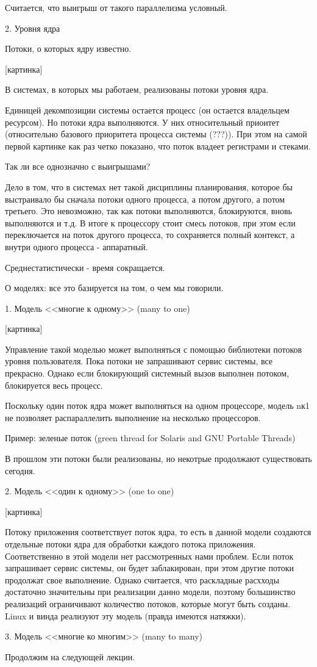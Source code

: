 \documentclass[a4paper, 12pt]{report}
\begin{document}
	Считается, что выигрыш от такого параллелизма условный.
	
	2. Уровня ядра
	
	Потоки, о которых ядру известно.
	
	[картинка]
	
	В системах, в которых мы работаем, реализованы потоки уровня ядра.
	
	Единицей декомпозиции системы остается процесс (он остается владельцем ресурсом). Но потоки ядра выполняются. У них относительный приоитет (относительно базового приоритета процесса системы (???)). При этом на самой первой картинке как раз четко показано, что поток владеет регистрами и стеками.
	
	Так ли все однозначно с выигрышами?
	
	Дело в том, что в системах нет такой дисциплины планирования, которое бы выстраивало бы сначала потоки одного процесса, а потом другого, а потом третьего. Это невозможно, так как потоки выполняются, блокируются, вновь выполняются и т.д. В итоге к процессору стоит смесь потоков, при этом если переключается на поток другого процесса, то сохраняется полный контекст, а внутри одного процесса - аппаратный.
	
	Среднестатистически - время сокращается.
	
	О моделях: все это базируется на том, о чем мы говорили.
	
	1. Модель <<многие к одному>> (many to one)
	
	[картинка]
	
	Управление такой моделью может выполняться с помощью библиотеки потоков уровня пользователя. Пока потоки не запрашивают сервис системы, все прекрасно. Однако если блокирующий системный вызов выполнен потоком, блокируется весь процесс.
	
	Поскольку один поток ядра может выполняться на одном процессоре, модель nк1 не позволяет распараллелить выполнение на несколько процессоров.
	
	Пример: зеленые поток (green thread for Solaris and GNU Portable Threads)
	
	В прошлом эти потоки были реализованы, но некотрые продолжают существовать сегодня.
	
	2. Модель <<один к одному>> (one to one)
	
	[картинка]
	
	Потоку приложения соответствует поток ядра, то есть в данной модели создаются отдельные потоки ядра для обработки каждого потока приложения. Соответственно в этой модели нет рассмотренных нами проблем. Если поток запрашивает сервис системы, он будет заблакирован, при этом другие потоки продолжат свое выполнение. Однако считается, что раскладные расхходы достаточно значительны при реализации данно модели, поэтому большинство реализаций ограничивают количество потоков, которые могут быть созданы. Linux и винда реализуют эту модель (правда имеются натяжки).
	
	3. Модель <<многие ко многим>> (many to many)
	
	Продолжим на следующей лекции.
\end{document}
